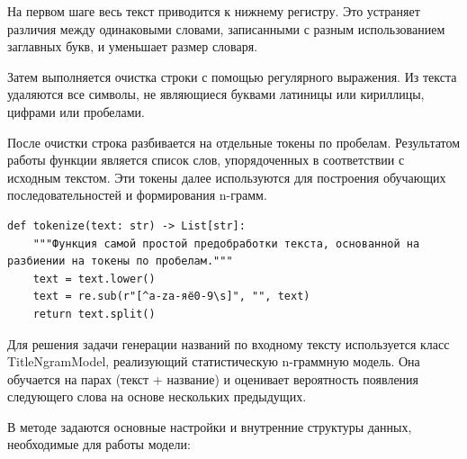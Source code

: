 \documentclass[coursework]{SCWorks}
\begin{document}
    На первом шаге весь текст приводится к нижнему регистру.
    Это устраняет различия между одинаковыми словами, записанными с разным использованием заглавных букв, и уменьшает размер словаря.

    Затем выполняется очистка строки с помощью регулярного выражения.
    Из текста удаляются все символы, не являющиеся буквами латиницы или кириллицы, цифрами или пробелами.

    После очистки строка разбивается на отдельные токены по пробелам.
    Результатом работы функции является список слов, упорядоченных в соответствии с исходным текстом.
    Эти токены далее используются для построения обучающих последовательностей и формирования n-грамм.

    \begin{verbatim}
def tokenize(text: str) -> List[str]:
    """Функция самой простой предобработки текста, основанной на разбиении на токены по пробелам."""
    text = text.lower()
    text = re.sub(r"[^a-zа-яё0-9\s]", "", text)
    return text.split()
    \end{verbatim}


    Для решения задачи генерации названий по входному тексту используется класс {TitleNgramModel},
    реализующий статистическую {n-граммную модель}.
    Она обучается на парах {(текст + название)} и оценивает вероятность появления следующего слова на основе нескольких предыдущих.

    В методе  задаются основные настройки и внутренние структуры данных, необходимые для работы модели:
\end{document}
